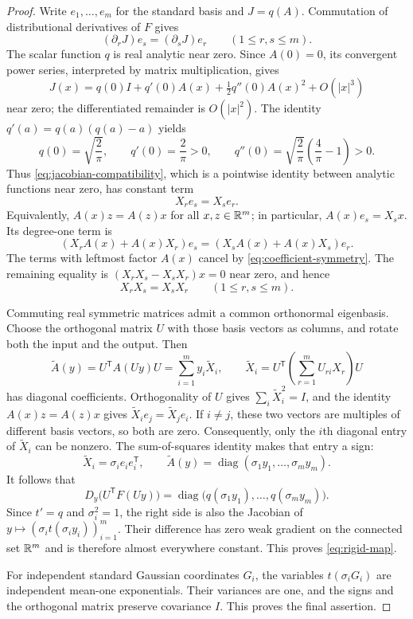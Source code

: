\begin{proof}
Write $e_1,\ldots,e_m$ for the standard basis and $J=q(A)$.
Commutation of distributional derivatives of $F$ gives
\begin{equation}\label{eq:jacobian-compatibility}
  (\partial_rJ)e_s=(\partial_sJ)e_r
  \qquad(1\le r,s\le m).
\end{equation}
The scalar function $q$ is real analytic near zero.  Since $A(0)=0$, its
convergent power series, interpreted by matrix multiplication, gives
\[
  J(x)=q(0)I+q'(0)A(x)+\tfrac12q''(0)A(x)^2+O(|x|^3)
\]
near zero; the differentiated remainder is $O(|x|^2)$.
The identity $q'(a)=q(a)(q(a)-a)$ yields
\[
  q(0)=\sqrt{\frac2\pi},\qquad
  q'(0)=\frac2\pi>0,\qquad
  q''(0)=\sqrt{\frac2\pi}\left(\frac4\pi-1\right)>0.
\]
Thus \eqref{eq:jacobian-compatibility}, which is a pointwise identity
between analytic functions near zero, has constant term
\begin{equation}\label{eq:coefficient-symmetry}
  X_re_s=X_se_r.
\end{equation}
Equivalently, $A(x)z=A(z)x$ for all $x,z\in\mathbb R^m$; in particular,
$A(x)e_s=X_sx$.  Its degree-one term is
\[
  (X_rA(x)+A(x)X_r)e_s
  =(X_sA(x)+A(x)X_s)e_r.
\]
The terms with leftmost factor $A(x)$ cancel by
\eqref{eq:coefficient-symmetry}.  The remaining equality is
$(X_rX_s-X_sX_r)x=0$ near zero, and hence
\begin{equation}\label{eq:coefficients-commute}
  X_rX_s=X_sX_r\qquad(1\le r,s\le m).
\end{equation}

Commuting real symmetric matrices admit a common orthonormal eigenbasis.
Choose the orthogonal matrix $U$ with those basis vectors as columns,
and rotate both the input and the output.  Then
\[
  \widetilde A(y)=U^{\mathsf T}A(Uy)U
     =\sum_{i=1}^m y_i\widetilde X_i,
  \qquad
  \widetilde X_i=U^{\mathsf T}
      \left(\sum_{r=1}^m U_{ri}X_r\right)U
\]
has diagonal coefficients.  Orthogonality of $U$ gives
$\sum_i\widetilde X_i^2=I$, and the identity $A(x)z=A(z)x$ gives
$\widetilde X_i e_j=\widetilde X_j e_i$.  If $i\ne j$, these two vectors
are multiples of different basis vectors, so both are zero.
Consequently, only the $i$th diagonal entry of $\widetilde X_i$ can be
nonzero.  The sum-of-squares identity makes that entry a sign:
\[
  \widetilde X_i=\sigma_i e_ie_i^{\mathsf T},
  \qquad
  \widetilde A(y)=\operatorname{diag}(\sigma_1y_1,\ldots,\sigma_my_m).
\]
It follows that
\[
  D_y\bigl(U^{\mathsf T}F(Uy)\bigr)
   =\operatorname{diag}\bigl(q(\sigma_1y_1),\ldots,q(\sigma_my_m)\bigr).
\]
Since $t'=q$ and $\sigma_i^2=1$, the right side is also the Jacobian of
$y\mapsto(\sigma_i t(\sigma_i y_i))_{i=1}^m$.
Their difference has zero weak gradient on the connected set $\mathbb R^m$
and is therefore almost everywhere constant.  This proves
\eqref{eq:rigid-map}.

For independent standard Gaussian coordinates $G_i$, the variables
$t(\sigma_iG_i)$ are independent mean-one exponentials.  Their variances
are one, and the signs and the orthogonal matrix preserve covariance
$I$.  This proves the final assertion.
\end{proof}

